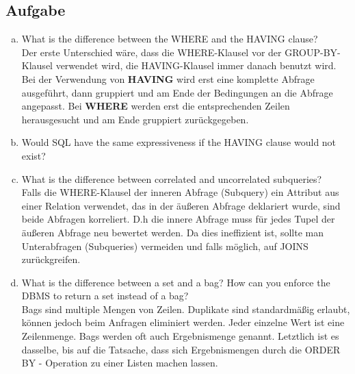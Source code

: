\documentclass[11pt,a4paper,DIV=9]{scrartcl}
\newcounter{temp}
\newcommand{\aufgabe}[1]{
  \setcounter{temp}{\value{subsection}}
  \setcounter{subsection}{#1}
  \addtocounter{subsection}{-1}
  \subsection{Aufgabe}
  \setcounter{subsection}{\value{temp}}
}
\begin{document}
\aufgabe{2}
\begin{enumerate}[a.]
\item What is the difference between the WHERE and the HAVING clause? \hfill\\
 Der erste Unterschied w\"are, dass die WHERE-Klausel vor der GROUP-BY-Klausel verwendet wird, die HAVING-Klausel immer danach benutzt wird. Bei der Verwendung von \textbf{HAVING} wird erst eine komplette Abfrage ausgef\"uhrt, dann gruppiert und am Ende der Bedingungen an die Abfrage angepasst. Bei \textbf{WHERE} werden erst die entsprechenden Zeilen herausgesucht und am Ende gruppiert zur\"uckgegeben.
\item Would SQL have the same expressiveness if the HAVING clause would not exist? \hfill\\
\item What is the difference between correlated and uncorrelated subqueries? \hfill\\
Falls die WHERE-Klausel der inneren Abfrage (Subquery) ein Attribut aus einer Relation verwendet, das in der \"au{\ss}eren Abfrage deklariert wurde, sind beide Abfragen korreliert. D.h die innere Abfrage muss f\"ur jedes Tupel der \"au{\ss}eren Abfrage neu bewertet werden. Da dies ineffizient ist, sollte man Unterabfragen (Subqueries) vermeiden und falls m\"oglich, auf JOINS zur\"uckgreifen.
\item What is the difference between a set and a bag? How can you enforce the DBMS to return a set instead of a bag? \\
Bags sind multiple Mengen von Zeilen. Duplikate sind standardm\"a{\ss}ig erlaubt, k\"onnen jedoch beim Anfragen eliminiert werden. Jeder einzelne Wert ist eine Zeilenmenge. Bags werden oft auch Ergebnismenge genannt. Letztlich ist es dasselbe, bis auf die Tatsache, dass sich Ergebnismengen durch die ORDER BY - Operation zu einer Listen machen lassen.

 \end{enumerate}
\end{document}
